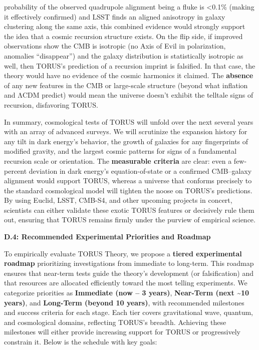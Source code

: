 \documentclass[
]{article}
\begin{document}
\begin{itemize}
\begin{itemize}
    probability of the observed quadrupole alignment being a fluke is
    \textless0.1\% (making it effectively confirmed) and LSST finds an
    aligned anisotropy in galaxy clustering along the same axis, this
    combined evidence would strongly support the idea that a cosmic
    recursion structure exists\hspace{0pt}. On the flip side, if
    improved observations show the CMB is isotropic (no Axis of Evil in
    polarization, anomalies ``disappear'') and the galaxy distribution
    is statistically isotropic as well, then TORUS's prediction of a
    recursion imprint is falsified\hspace{0pt}. In that case, the theory
    would have no evidence of the cosmic harmonics it claimed. The
    \textbf{absence} of any new features in the CMB or large-scale
    structure (beyond what inflation and ΛCDM predict) would mean the
    universe doesn't exhibit the telltale signs of recursion,
    disfavoring TORUS.
  \end{itemize}
\end{itemize}

In summary, cosmological tests of TORUS will unfold over the next
several years with an array of advanced surveys. We will scrutinize the
expansion history for any tilt in dark energy's behavior, the growth of
galaxies for any fingerprints of modified gravity, and the largest
cosmic patterns for signs of a fundamental recursion scale or
orientation. The \textbf{measurable criteria} are clear: even a
few-percent deviation in dark energy's equation-of-state or a confirmed
CMB--galaxy alignment would support TORUS, whereas a universe that
conforms precisely to the standard cosmological model will tighten the
noose on TORUS's predictions. By using Euclid, LSST, CMB-S4, and other
upcoming projects in concert, scientists can either validate these
exotic TORUS features or decisively rule them out, ensuring that TORUS
remains firmly under the purview of empirical science.

\textbf{D.4: Recommended Experimental Priorities and Roadmap}

To empirically evaluate TORUS Theory, we propose a \textbf{tiered
experimental roadmap} prioritizing investigations from immediate to
long-term. This roadmap ensures that near-term tests guide the theory's
development (or falsification) and that resources are allocated
efficiently toward the most telling experiments. We categorize
priorities as \textbf{Immediate (now -- 3 years)}, \textbf{Near-Term
(next \textasciitilde10 years)}, and \textbf{Long-Term (beyond 10
years)}, with recommended milestones and success criteria for each
stage. Each tier covers gravitational wave, quantum, and cosmological
domains, reflecting TORUS's breadth. Achieving these milestones will
either provide increasing support for TORUS or progressively constrain
it. Below is the schedule with key goals:
\end{document}
